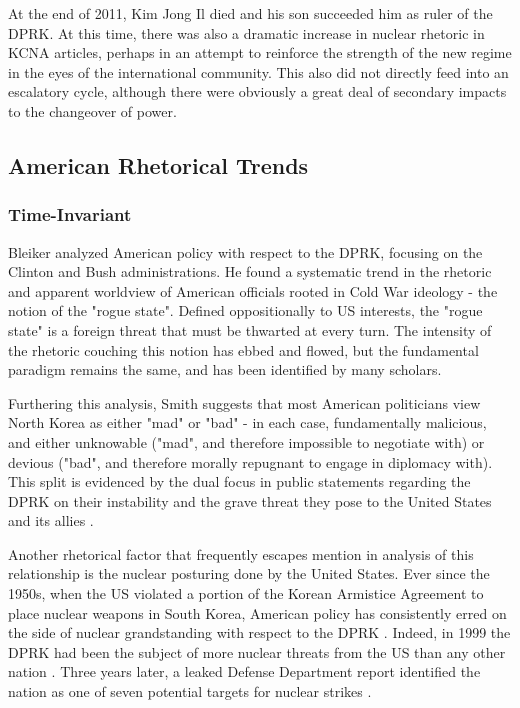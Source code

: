 \documentclass{article}
\begin{document}
At the end of 2011, Kim Jong Il died and his son succeeded him as ruler of the DPRK. At this time, there was also a dramatic increase in nuclear rhetoric in KCNA articles, perhaps in an attempt to reinforce the strength of the new regime in the eyes of the international community\cite{rich14}. This also did not directly feed into an escalatory cycle, although there were obviously a great deal of secondary impacts to the changeover of power.

\subsection{American Rhetorical Trends}
\subsubsection{Time-Invariant}

Bleiker \cite{bleiker} analyzed American policy with respect to the DPRK, focusing on the Clinton and Bush administrations. He found a systematic trend in the rhetoric and apparent worldview of American officials rooted in Cold War ideology - the notion of the "rogue state". Defined oppositionally to US interests, the "rogue state" is a foreign threat that must be thwarted at every turn. The intensity of the rhetoric couching this notion has ebbed and flowed, but the fundamental paradigm remains the same, and has been identified by many scholars\cite{bleiker,cumings,sigal,smith}.

Furthering this analysis, Smith suggests that most American politicians view North Korea as either "mad" or "bad" - in each case, fundamentally malicious, and either unknowable ("mad", and therefore impossible to negotiate with) or devious ("bad", and therefore morally repugnant to engage in diplomacy with). This split is evidenced by the dual focus in public statements regarding the DPRK on their instability and the grave threat they pose to the United States and its allies \cite{smith}. 

Another rhetorical factor that frequently escapes mention in analysis of this relationship is the nuclear posturing done by the United States. Ever since the 1950s, when the US violated a portion of the Korean Armistice Agreement to place nuclear weapons in South Korea, American policy has consistently erred on the side of nuclear grandstanding with respect to the DPRK \cite{cumings}. Indeed, in 1999 the DPRK had been the subject of more nuclear threats from the US than any other nation \cite{sigal}. Three years later, a leaked Defense Department report identified the nation as one of seven potential targets for nuclear strikes \cite{harnisch}.
\end{document}
